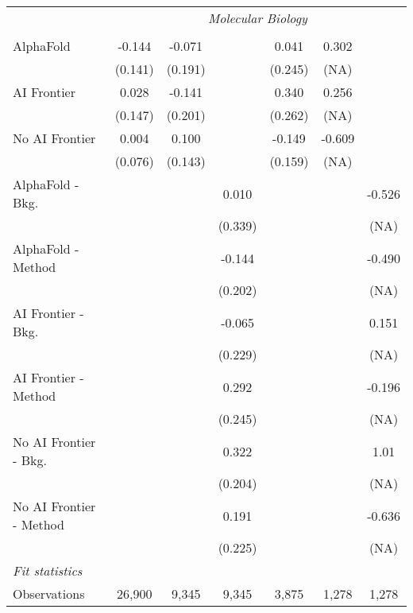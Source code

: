 \begin{tabular}{lcccccc}
 & \multicolumn{6}{c}{\textit{Molecular Biology}} \\ \\
   AlphaFold               & -0.144  & -0.071  &         & 0.041   & 0.302  &   \\   
                           & (0.141) & (0.191) &         & (0.245) & (NA)   &   \\   
   AI Frontier             & 0.028   & -0.141  &         & 0.340   & 0.256  &   \\   
                           & (0.147) & (0.201) &         & (0.262) & (NA)   &   \\   
   No AI Frontier          & 0.004   & 0.100   &         & -0.149  & -0.609 &   \\   
                           & (0.076) & (0.143) &         & (0.159) & (NA)   &   \\   
   AlphaFold - Bkg.        &         &         & 0.010   &         &        & -0.526\\   
                           &         &         & (0.339) &         &        & (NA)\\   
   AlphaFold - Method      &         &         & -0.144  &         &        & -0.490\\   
                           &         &         & (0.202) &         &        & (NA)\\   
   AI Frontier - Bkg.      &         &         & -0.065  &         &        & 0.151\\   
                           &         &         & (0.229) &         &        & (NA)\\   
   AI Frontier - Method    &         &         & 0.292   &         &        & -0.196\\   
                           &         &         & (0.245) &         &        & (NA)\\   
   No AI Frontier - Bkg.   &         &         & 0.322   &         &        & 1.01\\   
                           &         &         & (0.204) &         &        & (NA)\\   
   No AI Frontier - Method &         &         & 0.191   &         &        & -0.636\\   
                           &         &         & (0.225) &         &        & (NA)\\   
   \midrule
   \emph{Fit statistics}\\
   Observations            & 26,900  & 9,345   & 9,345   & 3,875   & 1,278  & 1,278\\  
   

\end{tabular}
